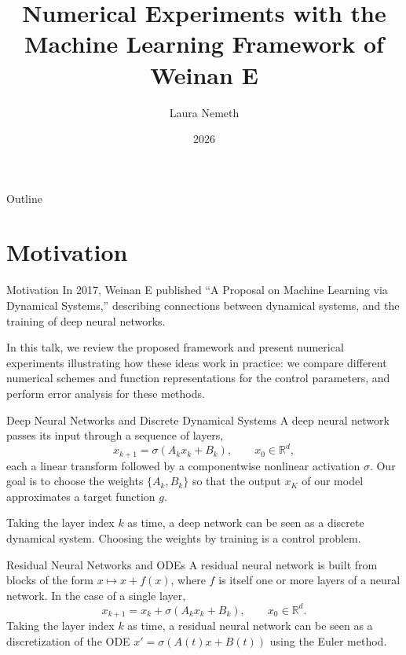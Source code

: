 \documentclass[aspectratio=169]{beamer}
\title{Numerical Experiments with the Machine Learning Framework of Weinan E}
\subtitle{}
\author{Laura Nemeth}
\date{2026}
\newcommand{\R}{\mathbb{R}}
\begin{document}
\begin{frame}
\titlepage
\end{frame}

\begin{frame}{Outline}
\tableofcontents
\end{frame}

\section{Motivation}

\begin{frame}{Motivation}
In 2017, Weinan E published ``A Proposal on Machine Learning via Dynamical Systems,'' describing connections between dynamical systems, and the training of deep neural networks.

\bigskip
In this talk, we review the proposed framework and present numerical experiments illustrating how these ideas work in practice: we compare different numerical schemes and function representations for the control parameters, and perform error analysis for these methods.
\end{frame}


\begin{frame}{Deep Neural Networks and Discrete Dynamical Systems}
A deep neural network passes its input through a sequence of layers,
\[
x_{k+1} = \sigma(A_k x_k + B_k), \qquad x_0 \in \R^d,
\]
each a linear transform followed by a componentwise nonlinear activation $\sigma$. Our goal is to choose the weights $\{A_k, B_k\}$ so that the output $x_K$ of our model approximates a target function $g$.

\bigskip
Taking the layer index $k$ as time, a deep network can be seen as a discrete dynamical system. Choosing the weights by training is a control problem.
\end{frame}


\begin{frame}{Residual Neural Networks and ODEs}
A residual neural network is built from blocks of the form $x \mapsto x + f(x)$, where $f$ is itself one or more layers of a neural network. In the case of a single layer,
\[
x_{k+1} = x_k + \sigma(A_k x_k + B_k), \qquad x_0 \in \R^d.
\]
Taking the layer index $k$ as time, a residual neural network can be seen as a discretization of the ODE $x' = \sigma(A(t)x + B(t))$ using the Euler method.

\end{frame}
\end{document}

